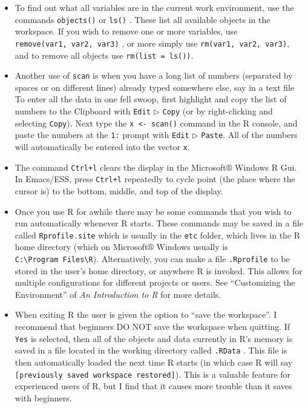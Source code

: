 \documentclass[]{book}
\providecommand{\tightlist}{%
  \setlength{\itemsep}{0pt}\setlength{\parskip}{0pt}}
\numberwithin{equation}{chapter}
\numberwithin{figure}{chapter}
\theoremstyle{plain}
\theoremstyle{definition}
\theoremstyle{remark}
\theoremstyle{definition}
\theoremstyle{definition}
\theoremstyle{remark}
\begin{document}
\begin{itemize}
\tightlist
\item
  To find out what all variables are in the current work environment,
  use the commands \texttt{objects()} 
  or \texttt{ls()} . These list all available
  objects in the workspace. If you wish to remove one or more variables,
  use \texttt{remove(var1,\ var2,\ var3)}
  , or more simply use
  \texttt{rm(var1,\ var2,\ var3)}, and to remove all objects use
  \texttt{rm(list\ =\ ls())}.
\item
  Another use of \texttt{scan} is when you have a long list of numbers
  (separated by spaces or on different lines) already typed somewhere
  else, say in a text file To enter all the data in one fell swoop,
  first highlight and copy the list of numbers to the Clipboard with
  \texttt{Edit} \(\triangleright\) \texttt{Copy} (or by right-clicking
  and selecting \texttt{Copy}). Next type the
  \texttt{x\ \textless{}-\ scan()} command in the R console, and paste
  the numbers at the \texttt{1:} prompt with \texttt{Edit}
  \(\triangleright\) \texttt{Paste}. All of the numbers will
  automatically be entered into the vector \texttt{x}.
\item
  The command \texttt{Ctrl+l} clears the display in the
  Microsoft\(\circledR\) Windows R Gui. In Emacs/ESS, press
  \texttt{Ctrl+l} repeatedly to cycle point (the place where the cursor
  is) to the bottom, middle, and top of the display.
\item
  Once you use R for awhile there may be some commands that you wish to
  run automatically whenever R starts. These commands may be saved in a
  file called \texttt{Rprofile.site}
   which is usually in the
  \texttt{etc} folder, which lives in the R home directory (which on
  Microsoft\(\circledR\) Windows usually is
  \texttt{C:\textbackslash{}Program\ Files\textbackslash{}R}).
  Alternatively, you can make a file \texttt{.Rprofile}
   to be stored in the user's home
  directory, or anywhere R is invoked. This allows for multiple
  configurations for different projects or users. See ``Customizing the
  Environment'' of \emph{An Introduction to R} for more details.
\item
  When exiting R the user is given the option to ``save the workspace''.
  I recommend that beginners DO NOT save the workspace when quitting. If
  \texttt{Yes} is selected, then all of the objects and data currently
  in R's memory is saved in a file located in the working directory
  called \texttt{.RData} . This file is
  then automatically loaded the next time R starts (in which case R will
  say \texttt{{[}previously\ saved\ workspace\ restored{]}}). This is a
  valuable feature for experienced users of R, but I find that it causes
  more trouble than it saves with beginners.
\end{itemize}
\end{document}
